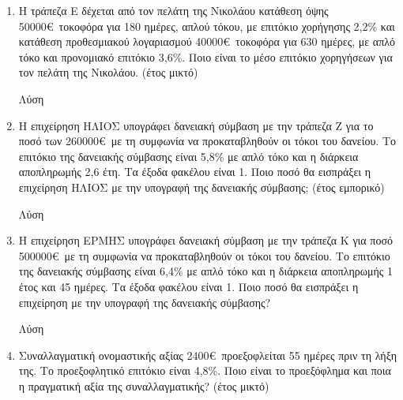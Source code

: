 \documentclass[a4paper,12pt]{article}
\begin{document}
\begin{enumerate}
\begin{center}
\end{center}

\item Η τράπεζα Ε δέχεται από τον πελάτη της Νικολάου κατάθεση όψης 50000\euro\ τοκοφόρα για 180 ημέρες, απλού τόκου, με επιτόκιο χορήγησης 2,2\% και κατάθεση προθεσμιακού λογαριασμού 40000\euro\, τοκοφόρα για 630 ημέρες, με απλό τόκο και προνομιακό επιτόκιο 3,6\%. Ποιο είναι το μέσο επιτόκιο χορηγήσεων για τον πελάτη της Νικολάου. (έτος μικτό)

\hspace{.15\textwidth}Λύση

\vspace{3cm}

\item Η επιχείρηση ΗΛΙΟΣ υπογράφει δανειακή σύμβαση με την τράπεζα Ζ για το ποσό των 260000\euro\ με τη συμφωνία να προκαταβληθούν οι τόκοι του δανείου. Το επιτόκιο της δανειακής σύμβασης είναι 5,8\% με απλό τόκο και η διάρκεια αποπληρωμής 2,6 έτη. Τα έξοδα φακέλου είναι 1\textperthousand. Ποιο ποσό θα εισπράξει η επιχείρηση ΗΛΙΟΣ με την υπογραφή της δανειακής σύμβασης; (έτος εμπορικό)

\hspace{.15\textwidth}Λύση

\vspace{3cm}

\newpage

\item Η επιχείρηση ΕΡΜΗΣ υπογράφει δανειακή σύμβαση με την τράπεζα Κ για ποσό 500000\euro\ με τη συμφωνία να προκαταβληθούν οι τόκοι του δανείου. Το επιτόκιο της δανειακής σύμβασης είναι 6,4\% με απλό τόκο και η διάρκεια αποπληρωμής 1 έτος και 45 ημέρες. Τα έξοδα φακέλου είναι 1\textperthousand. Ποιο ποσό θα εισπράξει η επιχείρηση με την υπογραφή της δανειακής σύμβασης?

\hspace{.15\textwidth}Λύση

\vspace{4cm}

\begin{center}
\end{center}

\item Συναλλαγματική ονομαστικής αξίας 2400\euro\ προεξοφλείται 55 ημέρες πριν τη λήξη της. Το προεξοφλητικό επιτόκιο είναι 4,8\%. Ποιο είναι το προεξόφλημα και ποια η πραγματική αξία της συναλλαγματικής? (έτος μικτό)


\end{enumerate}
\end{document}

